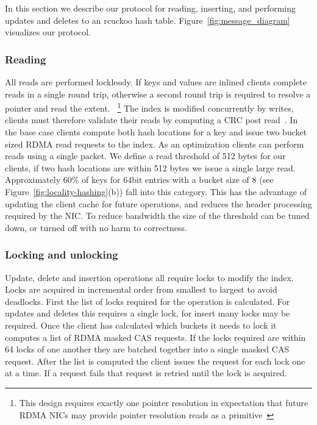 In this section we describe our protocol for reading,
inserting, and performing updates and deletes to an rcuckoo
hash table. Figure~\ref{fig:message_diagram} visualizes our
protocol.

\subsubsection{Reading} All reads are performed locklessly.
If keys and values are inlined clients complete reads in a
single round trip, otherwise a second round trip is required
to resolve a pointer and read the extent. 
~\footnote{This design requires exactly one pointer
resolution in expectation that future RDMA NICs may provide
pointer resolution reads as a primitive~\cite{prism}}
The index is modified concurrently by writes, clients must
therefore validate their reads by computing a CRC post
read~\cite{pilaf,cell}.
In the base case clients compute both hash locations for a
key and issue two bucket sized RDMA read requests to the
index. As an optimization clients can perform reads using a
single packet. We define a read threshold of 512 bytes for
our clients, if two hash locations are within 512 bytes we
issue a single large read.  Approximately 60\% of keys for
64bit entries with a bucket size of 8 (see
Figure~\ref{fig:locality-hashing}(b)) fall into this
category. This has the advantage of updating the client
cache for future operations, and reduces the header
processing required by the NIC. To reduce bandwidth the size
of the threshold can be tuned down, or turned off with no
harm to correctness.

\subsubsection{Locking and unlocking}

Update, delete and insertion operations all require locks to
modify the index. Locks are acquired in incremental order
from smallest to largest to avoid deadlocks. First the list
of locks required for the operation is calculated. For
updates and deletes this requires a single lock, for insert
many locks may be required. Once the client has calculated
which buckets it needs to lock it computes a list of RDMA
masked CAS requests. If the locks required are within 64
locks of one another they are batched together into a single
masked CAS request. After the list is computed the client
issues the request for each lock one at a time. If a request
fails that request is retried until the lock is acquired.


